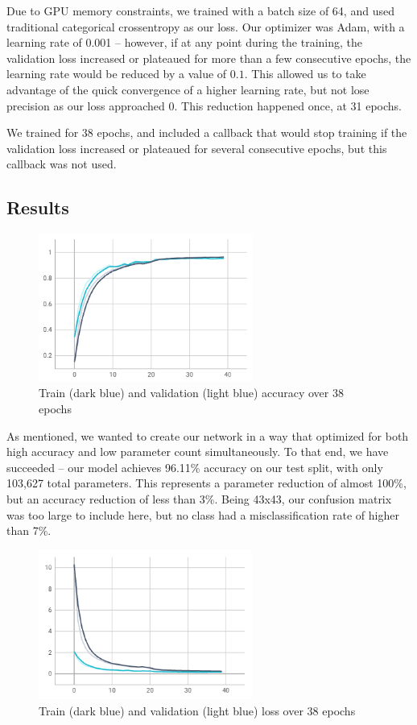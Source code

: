 \documentclass[10pt,twocolumn,letterpaper]{article}
\begin{document}
Due to GPU memory constraints, we trained with a batch size of 64, and used traditional categorical crossentropy as our loss. Our optimizer was Adam, with a learning rate of 0.001 -- however, if at any point during the training, the validation loss increased or plateaued for more than a few consecutive epochs, the learning rate would be reduced by a value of $0.1$. This allowed us to take advantage of the quick convergence of a higher learning rate, but not lose precision as our loss approached 0. This reduction happened once, at 31 epochs. 

We trained for 38 epochs, and included a callback that would stop training if the validation loss increased or plateaued for several consecutive epochs, but this callback was not used. 

\subsection{Results}

\begin{figure}[h]
\includegraphics[width=7cm]{epoch-accuracy}
\centering
\caption{Train (dark blue) and validation (light blue) accuracy over 38 epochs}
\label{fig:epochaccuracy}
\end{figure}

As mentioned, we wanted to create our network in a way that optimized for both high accuracy and low parameter count simultaneously. To that end, we have succeeded -- our model achieves 96.11\% accuracy on our test split, with only 103,627 total parameters. This represents a parameter reduction of almost 100\%, but an accuracy reduction of less than 3\%. Being 43x43, our confusion matrix was too large to include here, but no class had a misclassification rate of higher than 7\%. 

\begin{figure}[h]
\includegraphics[width=7cm]{epoch-loss}
\centering
\caption{Train (dark blue) and validation (light blue) loss over 38 epochs}
\label{fig:epochloss}
\end{figure}
\end{document}

